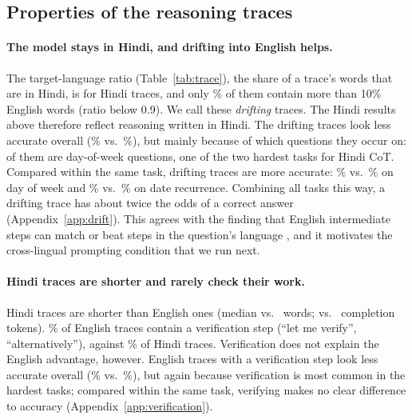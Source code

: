 \subsection{Properties of the reasoning traces}
\label{sec:traces}



\paragraph{The model stays in Hindi, and drifting into English helps.}
The target-language ratio (Table~\ref{tab:trace}), the share of a trace's words that are in Hindi, is \HiRatioPooled{} for Hindi traces, and only \HiRatioBelow{}\% of them contain more than 10\% English words (ratio below 0.9). We call these \emph{drifting} traces. The Hindi results above therefore reflect reasoning written in Hindi. The \HiNRatioBelow{} drifting traces look less accurate overall (\HiAccRatioBelow{}\% vs.\ \HiAccRatioAbove{}\%), but mainly because of which questions they occur on: \DriftDow{} of them are day-of-week questions, one of the two hardest tasks for Hindi CoT. Compared within the same task, drifting traces are more accurate: \DriftDowAcc{}\% vs.\ \DriftDowAccNo{}\% on day of week and \DriftRecAcc{}\% vs.\ \DriftRecAccNo{}\% on date recurrence. Combining all tasks this way, a drifting trace has about twice the odds of a correct answer (Appendix~\ref{app:drift}). This agrees with the finding that English intermediate steps can match or beat steps in the question's language \citep{shi-etal-2023-mgsm}, and it motivates the cross-lingual prompting condition \citep{qin-etal-2023-cross} that we run next.

\paragraph{Hindi traces are shorter and rarely check their work.}
Hindi traces are shorter than English ones (median \HiMedianWords{} vs.\ \EnMedianWords{} words; \HiMedianTokens{} vs.\ \EnMedianTokens{} completion tokens). \EnVerification{}\% of English traces contain a verification step (``let me verify'', ``alternatively''), against \HiVerification{}\% of Hindi traces. Verification does not explain the English advantage, however. English traces with a verification step look less accurate overall (\VerAccWith{}\% vs.\ \VerAccWithout{}\%), but again because verification is most common in the hardest tasks; compared within the same task, verifying makes no clear difference to accuracy (Appendix~\ref{app:verification}).

